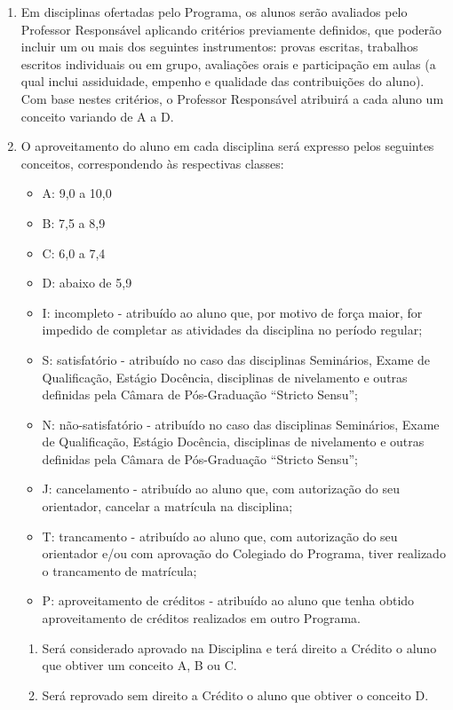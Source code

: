 \documentclass{article}
\begin{document}
\begin{enumerate}
	\item Em disciplinas ofertadas pelo Programa, os alunos serão avaliados pelo Professor Responsável aplicando critérios previamente definidos, que poderão incluir um ou mais dos seguintes instrumentos: provas escritas, trabalhos escritos individuais ou em grupo, avaliações orais e participação em aulas (a qual inclui assiduidade, empenho e qualidade das contribuições do aluno). Com base nestes critérios, o Professor Responsável atribuirá a cada aluno um conceito variando de A a D.
	
	\item O aproveitamento do aluno em cada disciplina será expresso pelos seguintes conceitos, correspondendo às respectivas classes:
	\begin{itemize}
		\item A: 9,0 a 10,0
		\item B: 7,5 a 8,9
		\item C: 6,0 a 7,4 
		\item D: abaixo de 5,9
		\item I: incompleto - atribuído ao aluno que, por motivo de força maior, for impedido de completar as atividades da disciplina no período regular;
		\item S: satisfatório - atribuído no caso das disciplinas Seminários, Exame de Qualificação, Estágio Docência, disciplinas de nivelamento e outras definidas pela Câmara de Pós-Graduação ``Stricto Sensu'';
		\item N: não-satisfatório - atribuído no caso das disciplinas Seminários, Exame de Qualificação, Estágio Docência, disciplinas de nivelamento e outras definidas pela Câmara de Pós-Graduação ``Stricto Sensu'';
		\item J: cancelamento - atribuído ao aluno que, com autorização do seu orientador, cancelar a matrícula na disciplina;
		\item T: trancamento - atribuído ao aluno que, com autorização do seu orientador e/ou com aprovação do Colegiado do Programa, tiver realizado o trancamento de matrícula;
		\item P: aproveitamento de créditos - atribuído ao aluno que tenha obtido aproveitamento de créditos realizados em outro Programa.
	\end{itemize}
	\begin{enumerate}
		\item Será considerado aprovado na Disciplina e terá direito a Crédito o aluno que obtiver um conceito A, B ou C.
		\item Será reprovado sem direito a Crédito o aluno que obtiver o conceito D.
	\end{enumerate}


\end{enumerate}
\end{document}
